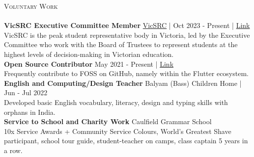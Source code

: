 \documentclass[a4paper]{article}
\newcommand{\lineunder} {
    \vspace*{-8pt} \\
    \hspace*{-18pt} \hrulefill \\
}
\newcommand{\header} [1] {
    {\hspace*{-18pt}\vspace*{6pt} \textsc{#1}}
    \vspace*{-6pt} \lineunder
}
\begin{document}
\header{Voluntary Work}
{\textbf{VicSRC Executive Committee Member}} \hfill \href{https://vicsrc.org.au/}{VicSRC} | Oct 2023 - Present | \href{https://vicsrc.org.au/}{\color{blue}Link}\\
VicSRC is the peak student representative body in Victoria, led by the Executive Committee who work with the Board of Trustees to represent students at the highest levels of decision-making in Victorian education.\\
\vspace*{2mm}
{\textbf{Open Source Contributor}} \hfill May 2021 - Present | \href{https://github.com/garv-shah}{\color{blue}Link}\\
Frequently contribute to FOSS on GitHub, namely within the Flutter ecosystem.\\
\vspace*{2mm}
{\textbf{English and Computing/Design Teacher}} \hfill Balyam (Bass) Children Home | Jun - Jul 2022\\
Developed basic English vocabulary, literacy, design and typing skills with orphans in India. \\
\vspace*{2mm}
{\textbf{Service to School and Charity Work}} \hfill Caulfield Grammar School\\
10x Service Awards + Community Service Colours, World's Greatest Shave participant, school tour guide, student-teacher on camps, class captain 5 years in a row.\\
\vspace*{2mm}
\end{document}
